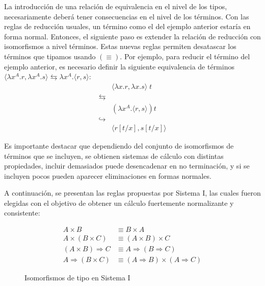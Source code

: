 \documentclass[]{report}
\begin{document}
	La introducción de una relación de equivalencia en el nivel de los tipos, necesariamente deberá tener consecuencias en el nivel de los términos.
	Con las reglas de reducción usuales, un término como el del ejemplo anterior estaría en forma normal.
	Entonces, el siguiente paso es extender la relación de reducción con isomorfismos a nivel términos.
	Estas nuevas reglas permiten desatascar los términos que tipamos usando $(\equiv)$.
	Por ejemplo, para reducir el término del ejemplo anterior, es necesario definir la siguiente equivalencia de términos $\langle \lambda x^A.r, \lambda x^A.s \rangle \leftrightarrows \lambda x^A. \langle r, s \rangle$:
	\begin{align*}
		& \langle \lambda x.r, \lambda x.s \rangle \; t \\
		\leftrightarrows& \\
		& (\lambda x^A. \langle r, s \rangle) t \\
		\hookrightarrow& \\
		& \langle r[t/x], s[t/x] \rangle
	\end{align*}
	
	Es importante destacar que dependiendo del conjunto de isomorfismos de términos que se incluyen, se obtienen sistemas de cálculo con distintas propiedades, incluir demasiados puede desencadenar en no terminación, y si se incluyen pocos pueden aparecer eliminaciones en formas normales.
	
	A continuación, se presentan las reglas propuestas por Sistema I, las cuales fueron elegidas con el objetivo de obtener un cálculo fuertemente normalizante y consistente:
	
	\begin{figure}[ht!]
		\begin{align*}
			A \times B &\equiv B \times A \\
			A \times (B \times C) &\equiv (A \times B) \times C \\
			(A \times B) \Rightarrow C &\equiv A \Rightarrow (B \Rightarrow C) \\
			A \Rightarrow (B \times C) &\equiv (A \Rightarrow B) \times (A \Rightarrow C)
		\end{align*}
		
		\caption{Isomorfismos de tipo en Sistema I}
	\end{figure}
	
\end{document}
